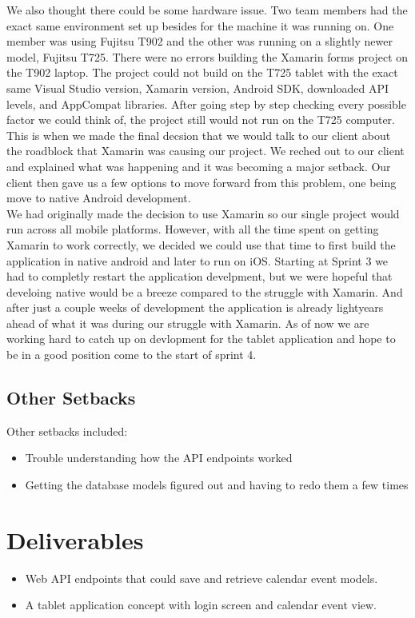 \documentclass{article}
\begin{document}
{\noindent We also thought there could be some hardware issue.  Two team members had the exact same environment set up besides for the machine it was running on.  One member was using Fujitsu T902 and the other was running on a slightly newer model, Fujitsu T725. There were no errors building the Xamarin forms project on the T902 laptop.  The project could not build on the T725 tablet with the exact same Visual Studio version, Xamarin version, Android SDK, downloaded API levels, and AppCompat libraries.  After going step by step checking every possible factor we could think of, the project still would not run on the T725 computer.  This is when we made the final decsion that we would talk to our client about the roadblock that Xamarin was causing our project.  We reched out to our client and explained what was happening and it was becoming a major setback. Our client then gave us a few options to move forward from this problem, one being move to native Android development.\\


\noindent We had originally made the decision to use Xamarin so our single project would run across all mobile platforms.  However, with all the time spent on getting Xamarin to work correctly, we decided we could use that time to first build the application in native android and later to run on iOS. Starting at Sprint 3 we had to completly restart the application develpment, but we were hopeful that develoing native would be a breeze compared to the struggle with Xamarin.  And after just a couple weeks of development the application is already lightyears ahead of what it was during our struggle with Xamarin. As of now we are working hard to catch up on devlopment for the tablet application and hope to be in a good position come to the start of sprint 4.

\subsection{Other Setbacks}
\noindent Other setbacks included:

\begin{itemize}
\item Trouble understanding how the API endpoints worked
\item Getting the database models figured out and having to redo them a few times
\end{itemize}

\section*{Deliverables}
\begin{itemize}
\item Web API endpoints that could save and retrieve calendar event models.
\item A tablet application concept with login screen and calendar event view.
\end{itemize}

}
\end{document}
